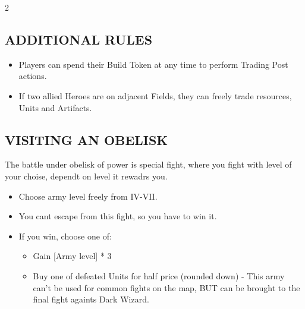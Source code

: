 \begin{multicols}{2}
\subsection*{\MakeUppercase{Additional Rules}}

\begin{itemize}
  \item Players can spend their Build Token at any time to perform Trading Post actions.
  \item If two allied Heroes are on adjacent Fields, they can freely trade resources, Units and Artifacts.
\end{itemize}

\subsection*{\MakeUppercase{Visiting an Obelisk}}
The battle under obelisk of power is special fight, where you fight with level of your choise, dependt on level it rewadrs you.
\begin{itemize}
  \item Choose army level freely from IV-VII.
  \item You cant escape from this fight, so you have to win it.
  \item If you win, choose one of:
  \begin{itemize}
    \item Gain [Army level] * 3 
    \item Buy one of defeated Units for half price (rounded down) -  This army can't be used for common fights on the map, BUT can be brought to the final fight againts Dark Wizard.
  \end{itemize}
\end{itemize}


\end{multicols}
